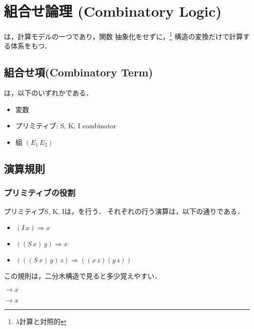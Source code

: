 \chapter{組合せ論理 (Combinatory Logic)}
は，計算モデルの一つであり，関数
抽象化をせずに，\footnote{$\lambda$計算と対照的} 構造の変換だけで計算す
る体系をもつ．

\section{組合せ項(Combinatory Term)}
は，以下のいずれかである．

\begin{itemize}
 \item 変数
 \item プリミティブ: S, K, I combinator
 \item 組 $(E_1 \, E_2)$
\end{itemize}

\section{演算規則}
\subsection{プリミティブの役割}
プリミティブS, K, Iは，を行う．
それぞれの行う演算は，以下の通りである．

\begin{itemize}
 \item $(I \, x) \Rightarrow x$
 \item $((S \, x) \, y) \Rightarrow x$ 
 \item $(((S \, x) \, y) \, z) \Rightarrow ((x \, z)(y \, z))$
\end{itemize}

この規則は，二分木構造で見ると多少覚えやすい．

\begin{center}
\begin{minipage}{7ex}
 \tree{}
 \endtree
\end{minipage}
\begin{minipage}{5ex}
 $\rightarrow x$
\end{minipage}
\end{center}

\begin{center}
\begin{minipage}{9ex}
 \tree{}
  \subtree{}
  \endsubtree
 \endtree
\end{minipage}
\begin{minipage}{5ex}
 $\rightarrow x$
\end{minipage}
\end{center}

